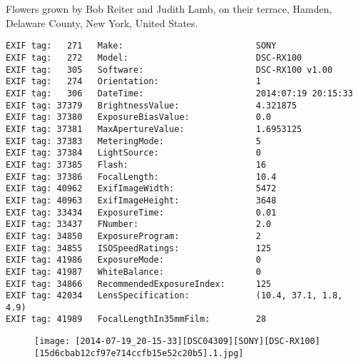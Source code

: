 \section{\protect{}}
\noindent Flowers grown by Bob Reiter and Judith Lamb, on their terrace, Hamden, Delaware County, New York, United States.
\noindent
\begin{lstlisting}
EXIF tag:   271   Make:                          SONY
EXIF tag:   272   Model:                         DSC-RX100
EXIF tag:   305   Software:                      DSC-RX100 v1.00
EXIF tag:   274   Orientation:                   1
EXIF tag:   306   DateTime:                      2014:07:19 20:15:33
EXIF tag: 37379   BrightnessValue:               4.321875
EXIF tag: 37380   ExposureBiasValue:             0.0
EXIF tag: 37381   MaxApertureValue:              1.6953125
EXIF tag: 37383   MeteringMode:                  5
EXIF tag: 37384   LightSource:                   0
EXIF tag: 37385   Flash:                         16
EXIF tag: 37386   FocalLength:                   10.4
EXIF tag: 40962   ExifImageWidth:                5472
EXIF tag: 40963   ExifImageHeight:               3648
EXIF tag: 33434   ExposureTime:                  0.01
EXIF tag: 33437   FNumber:                       2.0
EXIF tag: 34850   ExposureProgram:               2
EXIF tag: 34855   ISOSpeedRatings:               125
EXIF tag: 41986   ExposureMode:                  0
EXIF tag: 41987   WhiteBalance:                  0
EXIF tag: 34866   RecommendedExposureIndex:      125
EXIF tag: 42034   LensSpecification:             (10.4, 37.1, 1.8, 4.9)
EXIF tag: 41989   FocalLengthIn35mmFilm:         28

\end{lstlisting}
\clearpage
\begin{figure}
\raggedleft
\texttt{[image: [2014-07-19\_20-15-33][DSC04309][SONY][DSC-RX100][15d6cbab12cf97e714ccfb15e52c20b5].1.jpg]}
\end{figure}


\clearpage
